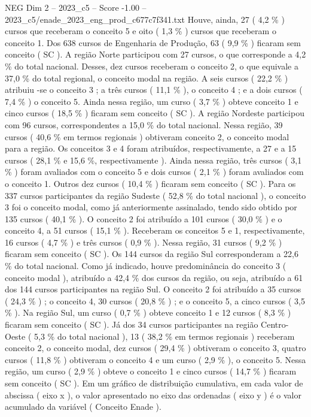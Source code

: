 \begin{textsample}{NEG Dim 2 – 2023\_c5 – Score -1.00 – 2023\_c5/enade\_2023\_eng\_prod\_c677c7f341.txt}
Houve, ainda, 27 ( 4,2 \% ) cursos que receberam o conceito 5 e oito ( 1,3 \% ) cursos que receberam o conceito 1.
Dos 638 cursos de Engenharia de Produção, 63 ( 9,9 \% ) ficaram sem conceito ( SC ).
A região Norte participou com 27 cursos, o que corresponde a 4,2 \% do total nacional.
Desses, dez cursos receberam o conceito 2, o que equivale a 37,0 \% do total regional, o conceito modal na região.
A seis cursos ( 22,2 \% ) atribuiu -se o conceito 3 ; a três cursos ( 11,1 \% ), o conceito 4 ; e a dois cursos ( 7,4 \% ) o conceito 5.
Ainda nessa região, um curso ( 3,7 \% ) obteve conceito 1 e cinco cursos ( 18,5 \% ) ficaram sem conceito ( SC ).
A região Nordeste participou com 96 cursos, correspondentes a 15,0 \% do total nacional.
Nessa região, 39 cursos ( 40,6 \% em termos regionais ) obtiveram conceito 2, o conceito modal para a região.
Os conceitos 3 e 4 foram atribuídos, respectivamente, a 27 e a 15 cursos ( 28,1 \% e 15,6 \%, respectivamente ).
Ainda nessa região, três cursos ( 3,1 \% ) foram avaliados com o conceito 5 e dois cursos ( 2,1 \% ) foram avaliados com o conceito 1.
Outros dez cursos ( 10,4 \% ) ficaram sem conceito ( SC ).
Para os 337 cursos participantes da região Sudeste ( 52,8 \% do total nacional ), o conceito 3 foi o conceito modal, como já anteriormente assinalado, tendo sido obtido por 135 cursos ( 40,1 \% ).
O conceito 2 foi atribuído a 101 cursos ( 30,0 \% ) e o conceito 4, a 51 cursos ( 15,1 \% ).
Receberam os conceitos 5 e 1, respectivamente, 16 cursos ( 4,7 \% ) e três cursos ( 0,9 \% ).
Nessa região, 31 cursos ( 9,2 \% ) ficaram sem conceito ( SC ).
Os 144 cursos da região Sul corresponderam a 22,6 \% do total nacional.
Como já indicado, houve predominância do conceito 3 ( conceito modal ), atribuído a 42,4 \% dos cursos da região, ou seja, atribuído a 61 dos 144 cursos participantes na região Sul.
O conceito 2 foi atribuído a 35 cursos ( 24,3 \% ) ; o conceito 4, 30 cursos ( 20,8 \% ) ; e o conceito 5, a cinco cursos ( 3,5 \% ).
Na região Sul, um curso ( 0,7 \% ) obteve conceito 1 e 12 cursos ( 8,3 \% ) ficaram sem conceito ( SC ).
Já dos 34 cursos participantes na região Centro-Oeste ( 5,3 \% do total nacional ), 13 ( 38,2 \% em termos regionais ) receberam conceito 2, o conceito modal, dez cursos ( 29,4 \% ) obtiveram o conceito 3, quatro cursos ( 11,8 \% ) obtiveram o conceito 4 e um curso ( 2,9 \% ), o conceito 5.
Nessa região, um curso ( 2,9 \% ) obteve o conceito 1 e cinco cursos ( 14,7 \% ) ficaram sem conceito ( SC ).
Em um gráfico de distribuição cumulativa, em cada valor de abscissa ( eixo x ), o valor apresentado no eixo das ordenadas ( eixo y ) é o valor acumulado da variável ( Conceito Enade ).

\end{textsample}
